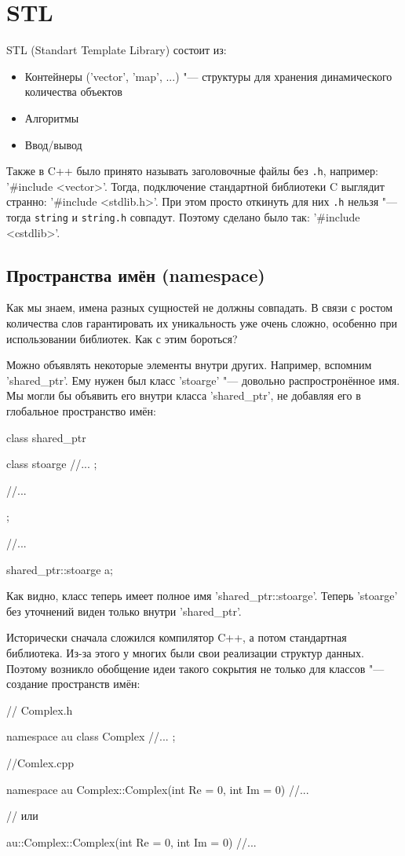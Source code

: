 \chapter{STL}

STL (Standart Template Library) состоит из:
\begin{itemize}
	\item Контейнеры (\cpp'vector', \cpp'map', ...) "--- структуры для хранения динамического количества объектов
	\item Алгоритмы
	\item Ввод/вывод
\end{itemize}
 
Также в C++ было принято называть заголовочные файлы без \verb'.h', например: \cpp'#include <vector>'.
Тогда, подключение стандартной библиотеки C выглядит странно: \cpp'#include <stdlib.h>'.
При этом просто откинуть для них \verb'.h' нельзя "--- тогда \verb'string' и \verb'string.h' совпадут.
Поэтому сделано было так: \cpp'#include <cstdlib>'.
 
\section{Пространства имён (namespace)}
 
Как мы знаем, имена разных сущностей не должны совпадать. В связи с ростом количества слов гарантировать их уникальность уже очень сложно, особенно при использовании библиотек. Как с этим бороться?
 
Можно объявлять некоторые элементы внутри других.
Например, вспомним \cpp'shared_ptr'.
Ему нужен был класс \cpp'stoarge' "--- довольно распростронённое имя.
Мы могли бы объявить его внутри класса \cpp'shared_ptr', не добавляя его в глобальное пространство имён:
\begin{cppcode}
class shared_ptr
{
	class stoarge
	{
		//...
	};
 
	//...
};
 
//...
 
shared_ptr::stoarge a;
\end{cppcode}
Как видно, класс теперь имеет полное имя \cpp'shared_ptr::stoarge'.
Теперь \cpp'stoarge' без уточнений виден только внутри \cpp'shared_ptr'.
 
Исторически сначала сложился компилятор C++, а потом стандартная библиотека. Из-за этого у многих были свои реализации структур данных.
Поэтому возникло обобщение идеи такого сокрытия не только для классов "--- создание пространств имён:
\begin{cppcode}
// Complex.h
 
namespace au
{
	class Complex
	{
		//...
	};
}
 
//Comlex.cpp
 
namespace au
{
	Complex::Complex(int Re = 0, int Im = 0)
	{
		//...
	}
}
 
// или
 
au::Complex::Complex(int Re = 0, int Im = 0)
{
	//...
}
\end{cppcode}
 
